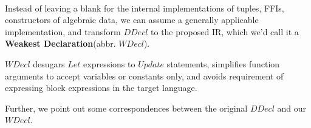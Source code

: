 \documentclass[a1,portrait]{a1poster}
\begin{document}
\begin{multicols}{2}
\begin{multicols}{2}
\vfill\null
\columnbreak

\begin{minipage}[t]{0.8\linewidth}
\begin{bnf*}
    \\
    \\
    \\
    \\
    \\
    \\
\end{bnf*}
\end{minipage}
\end{multicols}

Instead of leaving a blank for the internal implementations of tuples, FFIs, constructors of algebraic data,
we can assume a generally applicable implementation, and transform $DDecl$ to the proposed IR, which we'd call
it a \textbf{Weakest Declaration}(abbr. $WDecl$).


$WDecl$ desugars $Let$ expressions to $Update$ statements, simplifies function arguments to accept variables or constants only,
and avoids requirement of expressing block expressions in the target language.

Further, we point out some correspondences between the original $DDecl$ and our $WDecl$.

%



\end{multicols}
\end{document}
